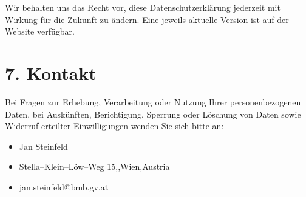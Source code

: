 \documentclass[a4paper,12pt]{article}
\makeatletter
\newcommand{\Strasse}{Stella--Klein--Löw--Weg 15}
\newcommand{\PLZ}{1020}
\newcommand{\Ort}{Wien}
\newcommand{\Land}{Austria}
\newcommand{\email}{jan.steinfeld@bmb.gv.at}
\makeatother
\begin{document}
Wir behalten uns das Recht vor, diese Datenschutzerklärung jederzeit mit Wirkung für die Zukunft zu ändern. Eine jeweils aktuelle Version ist auf der Website verfügbar.

\section*{7. Kontakt}

Bei Fragen zur Erhebung, Verarbeitung oder Nutzung Ihrer personenbezogenen Daten, bei Auskünften, Berichtigung, Sperrung oder Löschung von Daten sowie Widerruf erteilter Einwilligungen wenden Sie sich bitte an:

\begin{itemize}
  \item Jan Steinfeld
  \item \Strasse,\quad\PLZ,\quad\Ort,\quad\Land
  \item \email
\end{itemize}
\end{document}
